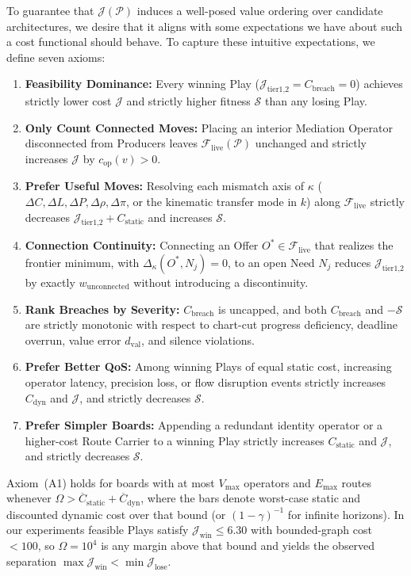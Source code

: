 To guarantee that $\mathcal{J}(\mathcal{P})$ induces a well-posed value ordering over candidate architectures, we desire that it aligns with some expectations we have about such a cost functional should behave.  To capture these intuitive expectations, we define seven axioms:
\begin{enumerate}[label=\textbf{(A\arabic*)}, leftmargin=2.4em, topsep=2pt, itemsep=1pt]
    \item \textbf{Feasibility Dominance:} Every winning Play ($\mathcal{J}_{\text{tier1,2}}=C_{\text{breach}}=0$) achieves strictly lower cost $\mathcal{J}$ and strictly higher fitness $\mathcal{S}$ than any losing Play.
    \item \textbf{Only Count Connected Moves:} Placing an interior Mediation Operator disconnected from Producers leaves $\mathcal{F}_{\text{live}}(\mathcal{P})$ unchanged and strictly increases $\mathcal{J}$ by $c_{\text{op}}(v) > 0$.
    \item \textbf{Prefer Useful Moves:} Resolving each mismatch axis of $\kappa$ ($\Delta C, \Delta L, \Delta P, \Delta\rho, \Delta\pi$, or the kinematic transfer mode in $k$) along $\mathcal{F}_{\text{live}}$ strictly decreases $\mathcal{J}_{\text{tier1,2}}+C_{\text{static}}$ and increases $\mathcal{S}$.
    \item \textbf{Connection Continuity:} Connecting an Offer $O^* \in \mathcal{F}_{\text{live}}$ that realizes the frontier minimum, with $\Delta_{\kappa}(O^*, N_j) = 0$, to an open Need $N_j$ reduces $\mathcal{J}_{\text{tier1,2}}$ by exactly $w_{\text{unconnected}}$ without introducing a discontinuity.
    \item \textbf{Rank Breaches by Severity:} $C_{\text{breach}}$ is uncapped, and both $C_{\text{breach}}$ and $-\mathcal{S}$ are strictly monotonic with respect to chart-cut progress deficiency, deadline overrun, value error $d_{\text{val}}$, and silence violations.
    \item \textbf{Prefer Better QoS:} Among winning Plays of equal static cost, increasing operator latency, precision loss, or flow disruption events strictly increases $C_{\text{dyn}}$ and $\mathcal{J}$, and strictly decreases $\mathcal{S}$.
    \item \textbf{Prefer Simpler Boards:} Appending a redundant identity operator or a higher-cost Route Carrier to a winning Play strictly increases $C_{\text{static}}$ and $\mathcal{J}$, and strictly decreases $\mathcal{S}$.
\end{enumerate}
Axiom~(A1) holds for boards with at most $V_{\max}$ operators and $E_{\max}$ routes whenever $\Omega > \overline{C}_{\text{static}} + \overline{C}_{\text{dyn}}$, where the bars denote worst-case static and discounted dynamic cost over that bound (or $(1-\gamma)^{-1}$ for infinite horizons).  In our experiments feasible Plays satisfy $\mathcal{J}_{\text{win}} \le 6.30$ with bounded-graph cost $< 100$, so $\Omega = 10^{4}$ is any margin above that bound and yields the observed separation $\max\mathcal{J}_{\text{win}} < \min\mathcal{J}_{\text{lose}}$.

